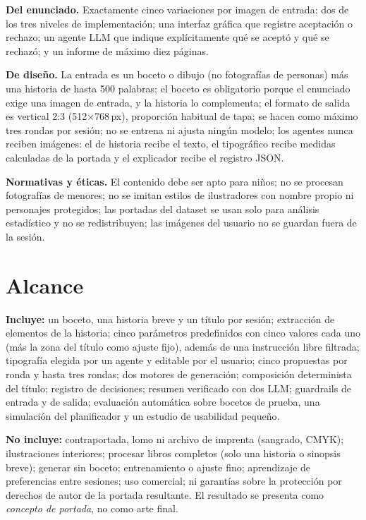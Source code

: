 \documentclass[10pt,a4paper,twocolumn]{article}
\begin{document}
\textbf{Del enunciado.} Exactamente cinco variaciones por imagen de entrada; dos de los tres niveles de implementación; una interfaz gráfica que registre aceptación o rechazo; un agente LLM que indique explícitamente qué se aceptó y qué se rechazó; y un informe de máximo diez páginas.

\textbf{De diseño.} La entrada es un boceto o dibujo (no fotografías de personas) más una historia de hasta 500 palabras; el boceto es obligatorio porque el enunciado exige una imagen de entrada, y la historia lo complementa; el formato de salida es vertical 2:3 (512$\times$768\,px), proporción habitual de tapa; se hacen como máximo tres rondas por sesión; no se entrena ni ajusta ningún modelo; los agentes nunca reciben imágenes: el de historia recibe el texto, el tipográfico recibe medidas calculadas de la portada y el explicador recibe el registro JSON.

\textbf{Normativas y éticas.} El contenido debe ser apto para niños; no se procesan fotografías de menores; no se imitan estilos de ilustradores con nombre propio ni personajes protegidos; las portadas del dataset se usan solo para análisis estadístico y no se redistribuyen; las imágenes del usuario no se guardan fuera de la sesión.

\section{Alcance}
\textbf{Incluye:} un boceto, una historia breve y un título por sesión; extracción de elementos de la historia; cinco parámetros predefinidos con cinco valores cada uno (más la zona del título como ajuste fijo), además de una instrucción libre filtrada; tipografía elegida por un agente y editable por el usuario; cinco propuestas por ronda y hasta tres rondas; dos motores de generación; composición determinista del título; registro de decisiones; resumen verificado con dos LLM; guardrails de entrada y de salida; evaluación automática sobre bocetos de prueba, una simulación del planificador y un estudio de usabilidad pequeño.

\textbf{No incluye:} contraportada, lomo ni archivo de imprenta (sangrado, CMYK); ilustraciones interiores; procesar libros completos (solo una historia o sinopsis breve); generar sin boceto; entrenamiento o ajuste fino; aprendizaje de preferencias entre sesiones; uso comercial; ni garantías sobre la protección por derechos de autor de la portada resultante. El resultado se presenta como \emph{concepto de portada}, no como arte final.
\end{document}
